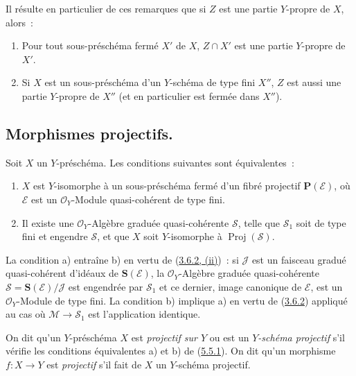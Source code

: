 Il résulte en particulier de ces remarques que si $Z$ est une partie
$Y$-propre de $X$, alors~:
\begin{enumerate}
  \item[\rm{1\textsuperscript{o}}] Pour tout sous-préschéma fermé $X'$ de
  $X$, $Z\cap X'$ est une partie $Y$-propre de $X'$.
  \item[\rm{2\textsuperscript{o}}] Si $X$ est un sous-préschéma d'un
  $Y$-schéma de type fini $X''$, $Z$ est aussi une partie $Y$-propre de
  $X''$ (et en particulier est fermée dans $X''$).
\end{enumerate}

\subsection{Morphismes projectifs.}
\label{subsection:II.5.5-fr}

\begin{proposition}[5.5.1]
\label{II.5.5.1-fr}
Soit $X$ un $Y$-préschéma. Les conditions suivantes sont équivalentes~:
\begin{enumerate}
  \item[\rm{a)}] $X$ est $Y$-isomorphe à un sous-préschéma fermé d'un fibré
  projectif $\mathbf{P}(\mathcal{E})$, où $\mathcal{E}$ est un
  $\mathcal{O}_Y$-Module quasi-cohérent de type fini.
  \item[\rm{b)}] Il existe une $\mathcal{O}_Y$-Algèbre graduée
  quasi-cohérente $\mathcal{S}$, telle que $\mathcal{S}_1$ soit de type fini
  et engendre $\mathcal{S}$, et que $X$ soit $Y$-isomorphe à
  $\operatorname{Proj}(\mathcal{S})$.
\end{enumerate}
\end{proposition}

La condition a) entraîne b) en vertu de
(\hyperref[II.3.6.2-fr]{3.6.2, (ii)})~: si $\mathcal{J}$ est un faisceau
gradué quasi-cohérent d'idéaux de $\mathbf{S}(\mathcal{E})$, la
$\mathcal{O}_Y$-Algèbre graduée quasi-cohérente
$\mathcal{S}=\mathbf{S}(\mathcal{E})/\mathcal{J}$ est engendrée par
$\mathcal{S}_1$ et ce dernier, image canonique de $\mathcal{E}$, est un
$\mathcal{O}_Y$-Module de type fini. La condition b) implique a) en vertu de
(\hyperref[II.3.6.2-fr]{3.6.2}) appliqué au cas où
$\mathcal{M}\to\mathcal{S}_1$ est l'application identique.


\begin{definition}[5.5.2]
\label{II.5.5.2-fr}
On dit qu'un $Y$-préschéma $X$ est \emph{projectif sur $Y$} ou est un
\emph{$Y$-schéma projectif} s'il vérifie les conditions équivalentes a) et b)
de (\hyperref[II.5.5.1-fr]{5.5.1}). On dit qu'un morphisme $f:X\to Y$ est
\emph{projectif} s'il fait de $X$ un $Y$-schéma projectif.
\end{definition}

